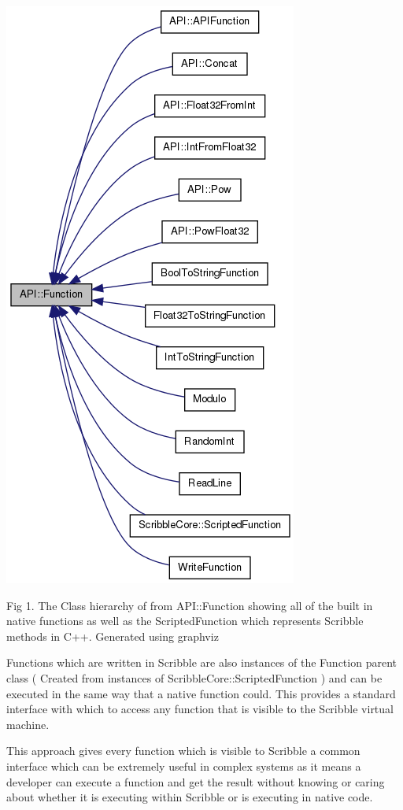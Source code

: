 \documentclass[]{final_report}
\begin{document}
\begin{center}
\includegraphics[scale=0.6]{"function_class_diagram"}
\end{center}

Fig 1. The Class hierarchy of from API::Function showing all of the built in native functions as well as the ScriptedFunction which represents Scribble methods in C++. Generated using graphviz

Functions which are written in Scribble are also instances of the Function parent class ( Created from instances of ScribbleCore::ScriptedFunction ) and can be executed in the same way that a native function could. This provides a standard interface with which to access any function that is visible to the Scribble virtual machine.

This approach gives every function which is visible to Scribble a common interface which can be extremely useful in complex systems as it means a developer can execute a function and get the result without knowing or caring about whether it is executing within Scribble or is executing in native code.
\end{document}
